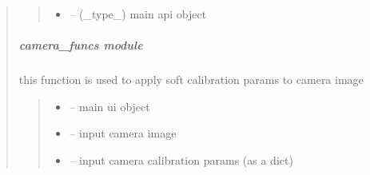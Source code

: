 \documentclass[letterpaper,10pt,english]{sphinxmanual}
\begin{document}
\begin{quote}
\begin{savenotes}
\begin{fulllineitems}
\begin{quote}
\begin{description}
\begin{itemize}
\item {} 
\sphinxAtStartPar
{} – (\_type\_) main api object

\end{itemize}

\end{description}\end{quote}

\end{fulllineitems}\end{savenotes}


\sphinxstepscope


\subparagraph{camera\_funcs module}
\label{\detokenize{setting/backend/camera_funcs:module-oxin.backend.camera_funcs}}\label{\detokenize{setting/backend/camera_funcs:camera-funcs-module}}\label{\detokenize{setting/backend/camera_funcs::doc}}

\begin{savenotes}\begin{fulllineitems}
\label{\detokenize{setting/backend/camera_funcs:oxin.backend.camera_funcs.apply_soft_calibrate_on_image}}
\pysigstartsignatures
{}
\pysigstopsignatures
\sphinxAtStartPar
this function is used to apply soft calibration params to camera image
\begin{quote}\begin{description}
\begin{itemize}
\item {} 
\sphinxAtStartPar
{} – main ui object

\item {} 
\sphinxAtStartPar
{} – input camera image

\item {} 
\sphinxAtStartPar
{} – input camera calibration params (as a dict)


\end{itemize}
\end{description}
\end{quote}
\end{fulllineitems}
\end{savenotes}
\end{quote}
\end{document}
